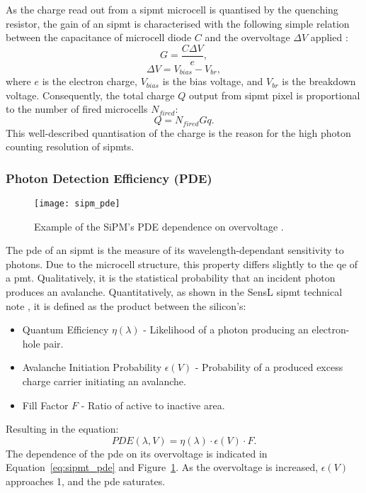 As the charge read out from a \gls{sipmt} microcell is quantised by the quenching resistor, the gain of an \gls{sipmt} is characterised with the following simple relation between the capacitance of microcell diode $C$ and the overvoltage $\Delta V$ applied \cite{SensL2011}:
\begin{equation} \label{eq:sipmt_gain}
G = \frac{C \Delta V}{e},
\end{equation}
\begin{equation} \label{eq:sipmt_voltage}
\Delta V = V_{bias} - V_{br},
\end{equation}
where $e$ is the electron charge, $V_{bias}$ is the bias voltage, and $V_{br}$ is the breakdown voltage. Consequently, the total charge $Q$ output from \gls{sipmt} pixel is proportional to the number of fired microcells $N_{fired}$:
\begin{equation} \label{eq:sipmt_charge}
Q = N_{fired} G q.
\end{equation}
This well-described quantisation of the charge is the reason for the high photon counting resolution of \glspl{sipmt}.

\subsubsection{Photon Detection Efficiency (PDE)}

\begin{figure}
	\centering
    \texttt{[image: sipm\_pde]} 
	\caption[Example of the SiPM's PDE dependence on overvoltage.]{Example of the SiPM's PDE dependence on overvoltage \cite{SensL2011}.}
	\label{fig:sipm_pde}
\end{figure}

The \gls{pde} of an \gls{sipmt} is the measure of its wavelength-dependant sensitivity to photons. Due to the microcell structure, this property differs slightly to the \gls{qe} of a \gls{pmt}. Qualitatively, it is the statistical probability that an incident photon produces an avalanche. Quantitatively, as shown in the SensL \gls{sipmt} technical note \cite{SensL2011}, it is defined as the product between the silicon's:
\begin{itemize}
\item Quantum Efficiency $\eta(\lambda)$ - Likelihood of a photon producing an electron-hole pair. 
\item Avalanche Initiation Probability $\epsilon(V)$ - Probability of a produced excess charge carrier initiating an avalanche.
\item Fill Factor $F$ - Ratio of active to inactive area.
\end{itemize}
Resulting in the equation:
\begin{equation} \label{eq:sipmt_pde}
PDE(\lambda, V) = \eta(\lambda) \cdot \epsilon(V) \cdot F.
\end{equation}
The dependence of the \gls{pde} on its overvoltage is indicated in Equation~\ref{eq:sipmt_pde} and Figure~\ref{fig:sipm_pde}. As the overvoltage is increased, $\epsilon(V)$ approaches 1, and the \gls{pde} saturates.

